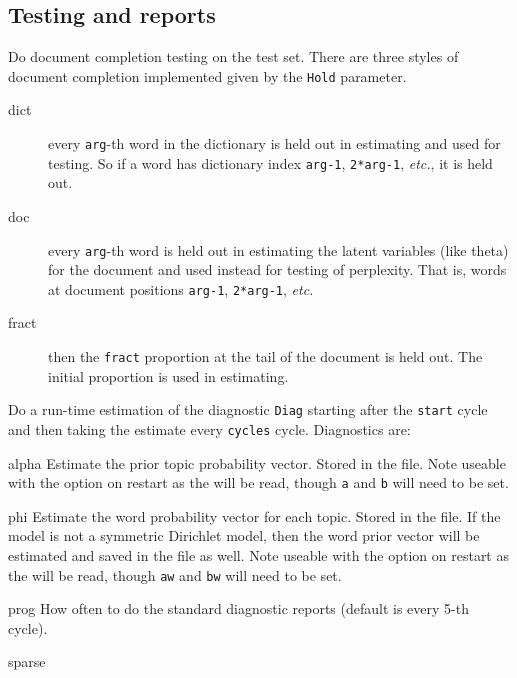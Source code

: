 \documentclass[a4paper,english]{article}
\begin{document}
\subsection{Testing and reports}
\begin{Description}\setlength{\itemsep}{0cm}
\item[\OptArg{-h}{Hold,arg}] 
Do document completion testing on the test set.
There are three styles of document completion implemented
given by the \texttt{Hold} parameter.
\begin{description}
\item[dict] every \texttt{arg}-th
word in the dictionary is held out in estimating
and used for testing.  So if a word has dictionary index 
\texttt{arg-1}, \texttt{2*arg-1}, \emph{etc.}, it is held out.
\item[doc] every \texttt{arg}-th
word is held out in estimating the latent variables (like theta)
for the document and used instead for testing of perplexity.
That is, words at document positions \texttt{arg-1}, \texttt{2*arg-1}, 
\emph{etc.}
\item[fract] then the \texttt{fract}
proportion at the tail of the document is held out.  
The initial proportion is used in estimating.
\end{description}
\item[\OptArg{-l}{Diag,cycles,start}] 
Do a run-time estimation of the diagnostic \texttt{Diag}
starting after the \texttt{start} cycle and then taking the
estimate every \texttt{cycles} cycle.
Diagnostics are:
\begin{Description}[testprob]\setlength{\itemsep}{0cm}
\item[alpha] 
Estimate the prior topic probability vector.
Stored in the  file.
Note useable with the 
 option on restart
as the  will be read,
though  \texttt{a} and \texttt{b}
will need to be set.
\item[phi] 
Estimate the word probability vector for each topic.
Stored in the  file.
If the model is not a symmetric Dirichlet model,
then the word prior vector will be estimated and
saved in the  file
as well.
Note useable with the 
 option on restart
as the  will be read,
though \texttt{aw} and \texttt{bw} will need to be set.
\item[prog] 
How often to do the standard diagnostic reports
(default is every 5-th cycle).
\item[sparse] 

\end{Description}
\end{Description}
\end{document}
